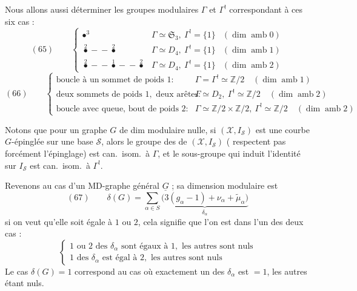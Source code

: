 \documentclass[11pt,a4paper]{article}
\begin{document}
Nous allons aussi déterminer les groupes modulaires $\Gamma$ et $\Gamma^{!}$ correspondant à ces six cas :
\[
(65)\qquad
\left\{
\begin{array}{lll}
\bullet^{3} & \Gamma \simeq \mathfrak{S}_3, \ \Gamma^{!} = \{1\} & (\dim \operatorname{amb} 0) \\[4pt]
\overset{2}{\bullet}\!\!-\!\!\!-\!\!\overset{2}{\bullet} & \Gamma \simeq D_4, \ \Gamma^{!} = \{1\} & (\dim \operatorname{amb} 1) \\[4pt]
\overset{2}{\bullet}\!\!-\!\!\!-\!\!\overset{1}{\bullet}\!\!-\!\!\!-\!\!\overset{2}{\bullet} & \Gamma \simeq D_4, \ \Gamma^{!} = \{1\} & (\dim \operatorname{amb} 2)
\end{array}
\right.
\]
\[
(66)\qquad
\left\{
\begin{array}{ll}
\text{boucle à un sommet de poids } 1 : & \Gamma = \Gamma^{!} \simeq \mathbb{Z}/2 \quad (\dim \operatorname{amb} 1) \\[2pt]
\text{deux sommets de poids } 1, \text{ deux arêtes} : & \Gamma \simeq D_2, \ \Gamma^{!} \simeq \mathbb{Z}/2 \quad (\dim \operatorname{amb} 2) \\[2pt]
\text{boucle avec queue, bout de poids } 2 : & \Gamma \simeq \mathbb{Z}/2 \times \mathbb{Z}/2, \ \Gamma^{!} \simeq \mathbb{Z}/2 \quad (\dim \operatorname{amb} 2)
\end{array}
\right.
\]

Notons que pour un graphe $G$ de dim modulaire nulle, si $(\mathcal{X}, I_{\mathcal{S}})$ est une courbe \struck{\ill{}} $G$-épinglée sur une base $\mathcal{S}$, alors le groupe des  de $(\mathcal{X}, I_{\mathcal{S}})$ ( respectent pas forcément l'épinglage) est can.\ isom.\ à $\Gamma$, et  le  sous-groupe qui induit l'identité sur $I_{\mathcal{S}}$ est can.\ isom.\ à $\Gamma^{!}$.

Revenons au cas d'un MD-graphe général $\underline{G}$ ; sa dimension modulaire est
\[
(67)\qquad \delta(G) = \sum_{\alpha \in S} \underbrace{\bigl(3(g_\alpha - 1) + \nu_\alpha + \tilde{\mu}_\alpha\bigr)}_{\delta_\alpha}
\]
si on veut qu'elle soit égale à $1$ ou $2$, cela signifie que l'on est dans l'un des deux cas :
\[
\left\{
\begin{array}{l}
1 \text{ ou } 2 \text{ des } \delta_\alpha \text{ sont égaux à } 1, \text{ les autres sont nuls} \\
1 \text{ des } \delta_\alpha \text{ est égal à } 2, \text{ les autres sont nuls}
\end{array}
\right.
\]
Le cas $\delta(G) = 1$ correspond au cas où exactement un des $\delta_\alpha$ est $= 1$, les autres étant nuls.
\end{document}
